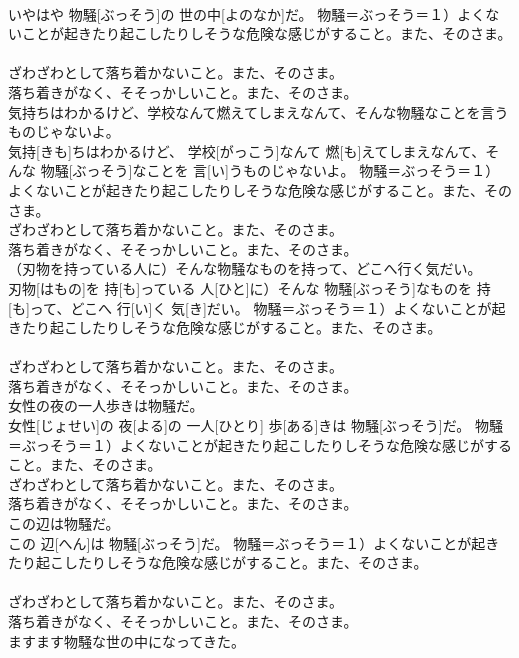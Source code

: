 \documentclass[8pt]{extreport}
\begin{document}
\begin{CJK}{UTF8}{min}
{\\	いやはや 物騒[ぶっそう]の 世の中[よのなか]だ。	物騒＝ぶっそう＝１）よくないことが起きたり起こしたりしそうな危険な感じがすること。また、そのさま。 　　　　　　　　
\\	ざわざわとして落ち着かないこと。また、そのさま。 　　　　　　　　
\\	落ち着きがなく、そそっかしいこと。また、そのさま。
\\	気持ちはわかるけど、学校なんて燃えてしまえなんて、そんな物騒なことを言うものじゃないよ。	
\\	気持[きも]ちはわかるけど、 学校[がっこう]なんて 燃[も]えてしまえなんて、そんな 物騒[ぶっそう]なことを 言[い]うものじゃないよ。	物騒＝ぶっそう＝１）よくないことが起きたり起こしたりしそうな危険な感じがすること。また、そのさま。 　　　　　　　　
\\	ざわざわとして落ち着かないこと。また、そのさま。 　　　　　　　　
\\	落ち着きがなく、そそっかしいこと。また、そのさま。
\\	（刃物を持っている人に）そんな物騒なものを持って、どこへ行く気だい。	
\\	刃物[はもの]を 持[も]っている 人[ひと]に）そんな 物騒[ぶっそう]なものを 持[も]って、どこへ 行[い]く 気[き]だい。	物騒＝ぶっそう＝１）よくないことが起きたり起こしたりしそうな危険な感じがすること。また、そのさま。 　　　　　　　　
\\	ざわざわとして落ち着かないこと。また、そのさま。 　　　　　　　　
\\	落ち着きがなく、そそっかしいこと。また、そのさま。
\\	女性の夜の一人歩きは物騒だ。	
\\	女性[じょせい]の 夜[よる]の 一人[ひとり] 歩[ある]きは 物騒[ぶっそう]だ。	物騒＝ぶっそう＝１）よくないことが起きたり起こしたりしそうな危険な感じがすること。また、そのさま。 　　　　　　　　
\\	ざわざわとして落ち着かないこと。また、そのさま。 　　　　　　　　
\\	落ち着きがなく、そそっかしいこと。また、そのさま。
\\	この辺は物騒だ。	
\\	この 辺[へん]は 物騒[ぶっそう]だ。	物騒＝ぶっそう＝１）よくないことが起きたり起こしたりしそうな危険な感じがすること。また、そのさま。 　　　　　　　　
\\	ざわざわとして落ち着かないこと。また、そのさま。 　　　　　　　　
\\	落ち着きがなく、そそっかしいこと。また、そのさま。
\\	ますます物騒な世の中になってきた。	
}
\end{CJK}
\end{document}
